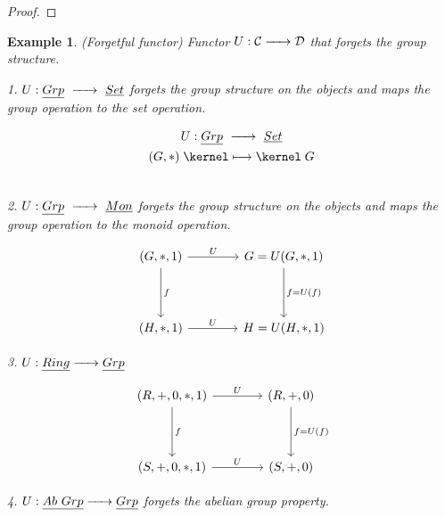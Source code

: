 \documentclass{article}
\newtheorem{example}{Example}[section]
\renewcommand{\to}{\xrightarrow{\hspace{0.5cm}}}  %
\renewcommand{\mapsto}{\mathrel{\kernel\longmapsto\kernel}}  %
\begin{document}
\begin{proof}
    \end{proof}

    \newpage

    \begin{example} (Forgetful functor)
        Functor $U: \mathcal{C} \to \mathcal{D}$ that forgets the group structure.

        \vspace{0.2in}

        1. $U:\underline{Grp} \ \to \ \underline{Set} $ forgets the group structure on the objects and maps the group operation to the set operation.

        \begin{gather*}
            U: \underline{Grp} \ \to \ \underline{Set}\\
            (G, *) \mapsto G\\\\
        \end{gather*}

        2. $U:\underline{Grp} \ \to \ \underline{Mon} $ forgets the group structure on the objects and maps the group operation to the monoid operation.

        \[
            \begin{tikzcd}[column sep=4em, row sep=4em]
            (G, *, 1)
                \arrow[r, "U"] \arrow[d, "f"]
                & G = U(G, *, 1) \arrow[d, "f=U(f)"] \\
                (H, *, 1) \arrow[r, "U"]
                & H = U(H, *, 1)
            \end{tikzcd}
        \]

        \vspace{0.2in}

        3. $U: \underline{Ring} \to \underline{Grp}$

        \[
            \begin{tikzcd}[column sep=4em, row sep=4em]
            (R,+, 0, *, 1)
                \arrow[r, "U"] \arrow[d, "f"]
                & (R, +, 0) \arrow[d, "f=U(f)"] \\
                (S,+, 0, *, 1) \arrow[r, "U"]
                & (S, +, 0)
            \end{tikzcd}
        \]

        4. $U: \underline{Ab \ Grp} \to \underline{Grp}$ forgets the abelian group property.

    \end{example}

    \vspace{0.2in}
\end{document}
